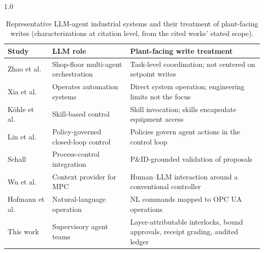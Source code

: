 \begin{table}[!t]
\centering
\caption{Representative LLM-agent industrial systems and their treatment of
plant-facing writes (characterizations at citation level, from the cited
works' stated scope).}
\label{tab:position}
\small
\begin{spacing}{1.0}
\begin{tabularx}{\columnwidth}{@{}p{}p{}X@{}}
\toprule
Study & LLM role & Plant-facing write treatment \\
\midrule
Zhao et al.~\cite{zhao2026shopfloor} & Shop-floor multi-agent orchestration & Task-level coordination; not centered on setpoint writes \\
Xia et al.~\cite{xia2025control} & Operates automation systems & Direct system operation; engineering limits not the focus \\
K{\"o}hle et al.~\cite{koehle2026llmdriven} & Skill-based control & Skill invocation; skills encapsulate equipment access \\
Lin et al.~\cite{lin2026agentic} & Policy-governed closed-loop control & Policies govern agent actions in the control loop \\
Schall~\cite{schall2026safe} & Process-control integration & P\&ID-grounded validation of proposals \\
Wu et al.~\cite{wu2025instructmpc} & Context provider for MPC & Human--LLM interaction around a conventional controller \\
Hofmann et al.~\cite{hofmann2025nlc} & Natural-language operation & NL commands mapped to OPC UA operations \\
\midrule
This work & Supervisory agent teams & Layer-attributable interlocks, bound approvals, receipt grading, audited ledger \\
\bottomrule
\end{tabularx}
\end{spacing}
\end{table}
